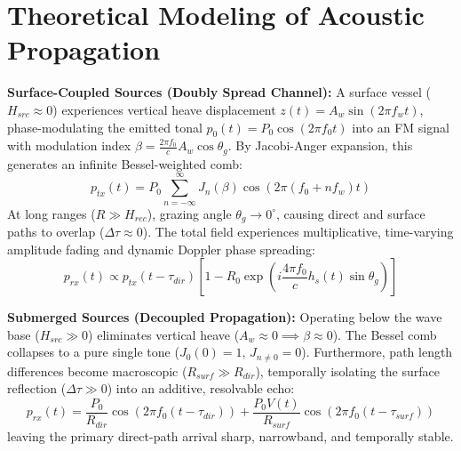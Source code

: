 \documentclass[11pt,a4paper]{article}
\begin{document}
\section{Theoretical Modeling of Acoustic Propagation}
\textbf{Surface-Coupled Sources (Doubly Spread Channel):} A surface vessel ($H_{src} \approx 0$) experiences vertical heave displacement $z(t) = A_w \sin(2\pi f_w t)$, phase-modulating the emitted tonal $p_0(t) = P_0 \cos(2\pi f_0 t)$ into an FM signal with modulation index $\beta = \frac{2\pi f_0}{c} A_w \cos\theta_g$.
By Jacobi-Anger expansion, this generates an infinite Bessel-weighted comb:
\begin{equation}
p_{tx}(t) = P_0 \sum_{n=-\infty}^{\infty} J_n(\beta) \cos\left(2\pi (f_0 + n f_w)t\right)
\end{equation}
At long ranges ($R \gg H_{rec}$), grazing angle $\theta_g \to 0^\circ$, causing direct and surface paths to overlap ($\Delta\tau \approx 0$). The total field experiences multiplicative, time-varying amplitude fading and dynamic Doppler phase spreading:
\begin{equation}
p_{rx}(t) \propto p_{tx}(t-\tau_{dir})\left[ 1 - R_0 \exp\left( i \frac{4\pi f_0}{c} h_s(t) \sin\theta_g \right) \right]
\end{equation}

\textbf{Submerged Sources (Decoupled Propagation):} Operating below the wave base ($H_{src} \gg 0$) eliminates vertical heave ($A_w \approx 0 \implies \beta \approx 0$). The Bessel comb collapses to a pure single tone ($J_0(0)=1$, $J_{n\neq 0}=0$). Furthermore, path length differences become macroscopic ($R_{surf} \gg R_{dir}$), temporally isolating the surface reflection ($\Delta\tau \gg 0$) into an additive, resolvable echo:
\begin{equation}
p_{rx}(t) = \frac{P_0}{R_{dir}}\cos\left(2\pi f_0 (t-\tau_{dir})\right) + \frac{P_0 V(t)}{R_{surf}}\cos\left(2\pi f_0 (t-\tau_{surf})\right)
\end{equation}
leaving the primary direct-path arrival sharp, narrowband, and temporally stable.
\end{document}
